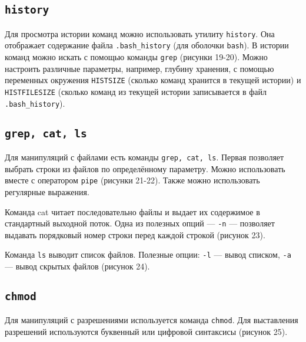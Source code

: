 \subsection{\texttt{history}}

Для просмотра истории команд можно использовать утилиту \texttt{history}. Она отображает содержание файла \texttt{.bash\_history} (для оболочки \texttt{bash}). В истории команд можно искать с помощью команды \texttt{grep} (рисунки 19-20). Можно настроить различные параметры, например, глубину хранения, с помощью переменных окружения \texttt{HISTSIZE} (сколько команд хранится в текущей истории) и \texttt{HISTFILESIZE} (сколько команд из текущей истории записывается в файл \texttt{.bash\_history}). 

\FloatBarrier


\subsection{\texttt{grep, cat, ls}}

Для манипуляций с файлами есть команды \texttt{grep, cat, ls}. Первая позволяет выбрать строки из файлов по определённому параметру. Можно использовать вместе с оператором \texttt{pipe} (рисунки 21-22). Также можно использовать регулярные выражения.

\FloatBarrier

Команда cat читает последовательно файлы и выдает их содержимое в стандартный выходной поток. Одна из полезных опций — \texttt{-n} — позволяет выдавать порядковый номер строки перед каждой строкой (рисунок 23).

\FloatBarrier

Команда \texttt{ls} выводит список файлов. Полезные опции: \texttt{-l} — вывод списком, \texttt{-a} — вывод скрытых файлов (рисунок 24).

\FloatBarrier


\subsection{\texttt{chmod}}

Для манипуляций с разрешениями используется команда \texttt{chmod}. Для выставления разрешений используются буквенный или цифровой синтаксисы (рисунок 25).

